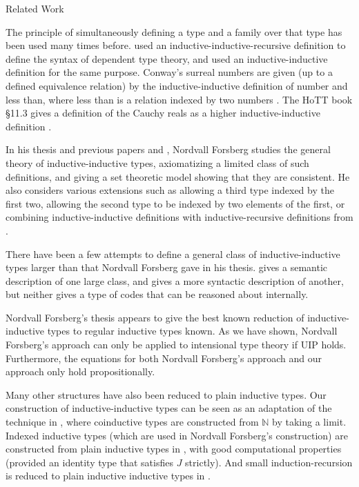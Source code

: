\documentclass[acmsmall,review]{acmart}\settopmatter{printfolios=true,printccs=false,printacmref=false}
\newcommand{\N}{\mathbb{N}}
\def\Forsberg/{Nordvall Forsberg}
\begin{document}
\begin{section}{Related Work}

The principle of simultaneously defining a type and a family over that type has been used many times before. \citet{danielssonIRdeptype} used an inductive-inductive-recursive definition to define the syntax of dependent type theory, and \citet{CHAPMAN200921} used an inductive-inductive definition for the same purpose. Conway's surreal numbers are given (up to a defined equivalence relation) by the inductive-inductive definition of number and less than, where less than is a relation indexed by two numbers \citep{conway2000numbers}. The HoTT book \S11.3 gives a definition of the Cauchy reals as a higher inductive-inductive definition \citep{hottbook}.

In his thesis \citet{nordvallforsberg2013thesis} and previous papers \citet{nordvallforsbergSetzer2010inductiveinductive} and \citet{nordvallforsbergSetzer2012finIndind}, \Forsberg/ studies the general theory of inductive-inductive types, axiomatizing a limited class of such definitions, and giving a set theoretic model showing that they are consistent. He also considers various extensions such as allowing a third type indexed by the first two, allowing the second type to be indexed by two elements of the first, or combining inductive-inductive definitions with inductive-recursive definitions from \citet{finiteaxiomatizationIR}.

There have been a few attempts to define a general class of inductive-inductive types larger than that \Forsberg/ gave in his thesis. \citet{Altenkirch2016QuotientIT} gives a semantic description of one large class, and \citet{KaposiKovacsHIITsyntax} gives a more syntactic description of another, but neither gives a type of codes that can be reasoned about internally.

\Forsberg/'s thesis \citep{nordvallforsberg2013thesis} appears to give the best known reduction of inductive-inductive types to regular inductive types known. As we have shown, \Forsberg/'s approach can only be applied to intensional type theory if UIP holds. Furthermore, the equations for both \Forsberg/'s approach and our approach only hold propositionally.

Many other structures have also been reduced to plain inductive types. Our construction of inductive-inductive types can be seen as an adaptation of the technique in \citet{nonwellfoundedtrees}, where coinductive types are constructed from $\N$ by taking a limit. Indexed inductive types (which are used in \Forsberg/'s construction) are constructed from plain inductive types in \citet{altenkirch2015indexed}, with good computational properties (provided an identity type that satisfies $J$ strictly). And small induction-recursion is reduced to plain inductive inductive types in \citet{alti:tlca13-small-ir}.

\end{section}
\end{document}

